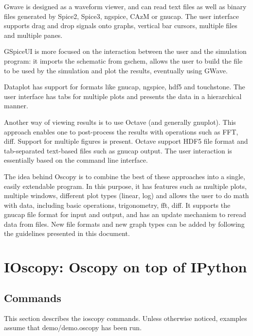 \documentclass[a4paper,11pt]{article}
\begin{document}
Gwave is designed as a waveform viewer, and can read text files as well as binary files generated by Spice2, Spice3, ngspice, CAzM or gnucap.
The user interface supports drag and drop signals onto graphs, vertical bar cursors, multiple files and multiple panes.

GSpiceUI is more focused on the interaction between the user and the simulation program: it imports the schematic from gschem, allows the user to build the file to be used by the simulation and plot the results, eventually using GWave.

Dataplot has support for formats like gnucap, ngspice, hdf5 and touchstone.
The user interface has tabs for multiple plots and presents the data in a hierarchical manner.

Another way of viewing results is to use Octave (and generally gnuplot).
This approach enables one to post-process the results with operations such as FFT, diff.
Support for multiple figures is present.
Octave support HDF5 file format and tab-separated text-based files such as gnucap output.
The user interaction is essentially based on the command line interface.

The idea behind Oscopy is to combine the best of these approaches into a single, easily extendable program.
In this purpose, it has features such as multiple plots, multiple windows, different plot types (linear, log) and allows the user to do math with data, including basic operations, trigonometry, fft, diff.
It supports the gnucap file format for input and output, and has an update mechanism to reread data from files.
New file formats and new graph types can be added by following the guidelines presented in this document.

\section{IOscopy: Oscopy on top of IPython}


\subsection{Commands}
This section describes the ioscopy commands. Unless otherwise noticed, examples assume that demo/demo.oscopy has been run.
\end{document}
